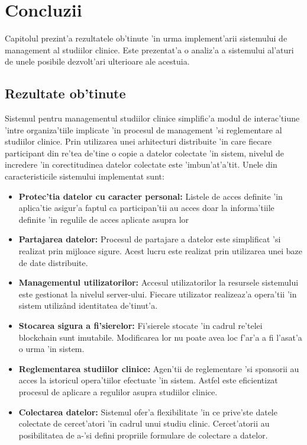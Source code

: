 \documentclass[12pt,a4paper,twoside]{report}
\begin{document}
\chapter{Concluzii}

Capitolul prezint'a rezultatele ob'tinute 'in urma implement'arii sistemului de management al studiilor clinice. Este prezentat'a o analiz'a a sistemului al'aturi de unele posibile dezvolt'ari ulterioare ale acestuia.

\section{Rezultate ob'tinute}

    Sistemul pentru managementul studiilor clinice simplific'a modul de interac'tiune 'intre organiza'tiile implicate 'in procesul de management 'si reglementare al studiilor clinice. Prin utilizarea unei arhitecturi distribuite 'in care fiecare participant din re'tea de'tine o copie a datelor colectate 'in sistem, nivelul de incredere 'in corectitudinea datelor colectate este 'imbun'at'a'tit. Unele din caracteristicile sistemului implementat sunt:
    \begin{itemize}
        \item \textbf{Protec'tia datelor cu caracter personal:} Listele de acces definite 'in aplica'tie asigur'a faptul ca participan'tii au acces doar la informa'tiile definite 'in regulile de acces aplicate asupra lor
        \item \textbf{Partajarea datelor:} Procesul de partajare a datelor este simplificat 'si realizat prin mijloace sigure. Acest lucru este realizat prin utilizarea unei baze de date distribuite.
        \item \textbf{Managementul utilizatorilor:} Accesul utilizatorilor la resursele sistemului este gestionat la nivelul server-ului. Fiecare utilizator realizeaz'a opera'tii 'in sistem utiliz\^and identitatea de'tinut'a.
        \item \textbf{Stocarea sigura a fi'sierelor:} Fi'sierele stocate 'in cadrul re'telei blockchain sunt imutabile. Modificarea lor nu poate avea loc f'ar'a a fi l'asat'a o urma 'in sistem.
        \item \textbf{Reglementarea studiilor clinice:} Agen'tii de reglementare 'si sponsorii au acces la istoricul opera'tiilor efectuate 'in sistem. Astfel este eficientizat procesul de aplicare a regulilor asupra studiilor clinice.
        \item \textbf{Colectarea datelor:} Sistemul ofer'a flexibilitate 'in ce prive'ste datele colectate de cercet'atori 'in cadrul unui studiu clinic. Cercet'atorii au posibilitatea de a-'si defini propriile formulare de colectare a datelor.
    \end{itemize}
    
\end{document}
